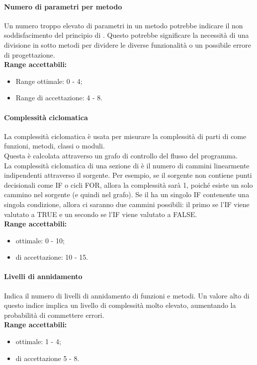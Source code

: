 \documentclass{scalatekids-article}
\begin{document}
\paragraph{Numero di parametri per metodo}
Un numero troppo elevato di parametri in un metodo potrebbe indicare il non soddisfacimento del principio di \textit{}. Questo potrebbe significare la necessità di una divisione in sotto metodi per dividere le diverse funzionalità o un possibile errore di progettazione.\\
\textbf{Range accettabili:}
\begin{itemize}
  \item Range ottimale: 0 - 4;
  \item Range di accettazione: 4 - 8.
\end{itemize}

\paragraph{Complessità ciclomatica}
La complessità ciclomatica è usata per misurare la complessità di parti di  come funzioni, metodi, classi o moduli.\\
Questa è calcolata attraverso un grafo di controllo del flusso del programma.\\La complessità ciclomatica di una sezione di  è il numero di cammini linearmente indipendenti attraverso il  sorgente. Per esempio, se il  sorgente non contiene punti decisionali come IF o cicli FOR, allora la complessità sarà 1, poiché esiste un solo cammino nel sorgente (e quindi nel grafo). Se il  ha un singolo IF contenente una singola condizione, allora ci saranno due cammini possibili: il primo se l'IF viene valutato a TRUE e un secondo se l'IF viene valutato a FALSE.\\
\textbf{Range accettabili:}
\begin{itemize}
  \item {} ottimale: 0 - 10;
  \item {} di accettazione: 10 - 15.
\end{itemize}

\paragraph{Livelli di annidamento}
Indica il numero di livelli di annidamento di funzioni e metodi. Un valore alto di questo indice implica un livello di complessità molto elevato, aumentando la probabilità di commettere errori.\\
\textbf{Range accettabili:}
\begin{itemize}
  \item {} ottimale: 1 - 4;
  \item {} di accettazione 5 - 8.
\end{itemize}
\newpage
\appendix
\end{document}
